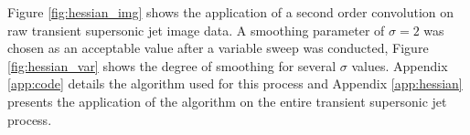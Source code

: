 Figure \ref{fig:hessian_img} shows the application of a second order convolution on raw transient supersonic jet image data. A smoothing parameter of $\sigma=2$ was chosen as an acceptable value after a variable sweep was conducted, Figure \ref{fig:hessian_var} shows the degree of smoothing for several $\sigma$ values. Appendix \ref{app:code} details the algorithm used for this process and Appendix \ref{app:hessian} presents the application of the algorithm on the entire transient supersonic jet process.

\begin{figure}[H]
  \centering
  \hfill
  \\

\end{figure}
